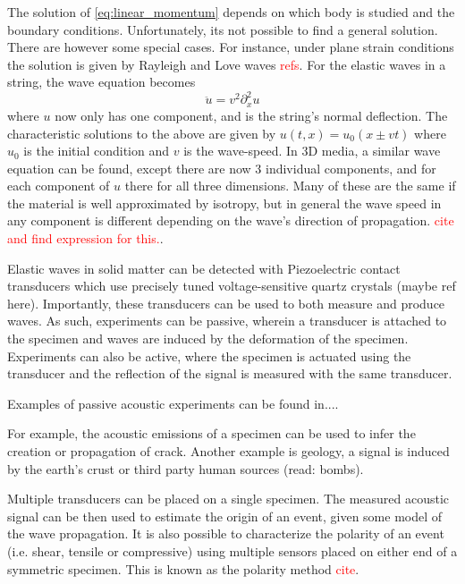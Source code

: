 The solution of \eqref{eq:linear_momentum} depends on which body is studied and the boundary conditions. Unfortunately, its not possible to find a general solution. There are however some special cases. For instance, under plane strain conditions the solution is given by Rayleigh and Love waves \textcolor{red}{refs}. For the elastic waves in a string, the wave equation becomes
\begin{equation}
	\ddot{u} = v^2 \partial^2_x u
\end{equation}
where $u$ now only has one component, and is the string's normal deflection. The characteristic solutions to the above are given by $u(t, x) = u_0(x \pm vt)$ where $u_0$ is the initial condition and $v$ is the wave-speed. In 3D media, a similar wave equation can be found, except there are now $3$ individual components, and for each component of $u$ there for all three dimensions. Many of these are the same if the material is well approximated by isotropy, but in general the wave speed in any component is different depending on the wave's direction of propagation. \textcolor{red}{cite and find expression for this.}.


Elastic waves in solid matter can be detected with Piezoelectric contact transducers which use precisely tuned voltage-sensitive quartz crystals (maybe ref here). Importantly, these transducers can be used to both measure and produce waves. As such, experiments can be passive, wherein a transducer is attached to the specimen and waves are induced by the deformation of the specimen. Experiments can also be active, where the specimen is actuated using the transducer and the reflection of the signal is measured with the same transducer.

Examples of passive acoustic experiments can be found in....

For example, the acoustic emissions of a specimen can be used to infer the creation or propagation of crack. Another example is geology, a signal is induced by the earth's crust or third party human sources (read: bombs).

Multiple transducers can be placed on a single specimen. The measured acoustic signal can be then used to estimate the origin of an event, given some model of the wave propagation. It is also possible to characterize the polarity of an event (i.e. shear, tensile  or compressive) using multiple sensors placed on either end of a symmetric specimen. This is known as the polarity method \textcolor{red}{cite}. 


